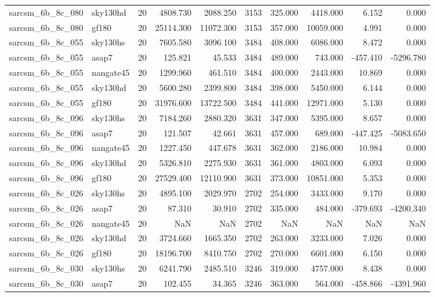 \documentclass{article}
\begin{document}
\begin{longtable}{llrrrrrrrr}
sarcsm\_6b\_8c\_080 & sky130hd & 20 & 4808.730 & 2088.250 & 3153 & 325.000 & 4418.000 & 6.152 & 0.000 \\
sarcsm\_6b\_8c\_080 & gf180 & 20 & 25114.300 & 11072.300 & 3153 & 357.000 & 10059.000 & 4.991 & 0.000 \\
sarcsm\_6b\_8c\_055 & sky130hs & 20 & 7605.580 & 3096.100 & 3484 & 408.000 & 6086.000 & 8.472 & 0.000 \\
sarcsm\_6b\_8c\_055 & asap7 & 20 & 125.821 & 45.533 & 3484 & 489.000 & 743.000 & -457.410 & -5296.780 \\
sarcsm\_6b\_8c\_055 & nangate45 & 20 & 1299.960 & 461.510 & 3484 & 400.000 & 2443.000 & 10.869 & 0.000 \\
sarcsm\_6b\_8c\_055 & sky130hd & 20 & 5600.280 & 2399.800 & 3484 & 398.000 & 5450.000 & 6.144 & 0.000 \\
sarcsm\_6b\_8c\_055 & gf180 & 20 & 31976.600 & 13722.500 & 3484 & 441.000 & 12971.000 & 5.130 & 0.000 \\
sarcsm\_6b\_8c\_096 & sky130hs & 20 & 7184.260 & 2880.320 & 3631 & 347.000 & 5395.000 & 8.657 & 0.000 \\
sarcsm\_6b\_8c\_096 & asap7 & 20 & 121.507 & 42.661 & 3631 & 457.000 & 689.000 & -447.425 & -5083.650 \\
sarcsm\_6b\_8c\_096 & nangate45 & 20 & 1227.450 & 447.678 & 3631 & 362.000 & 2186.000 & 10.984 & 0.000 \\
sarcsm\_6b\_8c\_096 & sky130hd & 20 & 5326.810 & 2275.930 & 3631 & 361.000 & 4803.000 & 6.093 & 0.000 \\
sarcsm\_6b\_8c\_096 & gf180 & 20 & 27529.400 & 12110.900 & 3631 & 373.000 & 10851.000 & 5.353 & 0.000 \\
sarcsm\_6b\_8c\_026 & sky130hs & 20 & 4895.100 & 2029.970 & 2702 & 254.000 & 3433.000 & 9.170 & 0.000 \\
sarcsm\_6b\_8c\_026 & asap7 & 20 & 87.310 & 30.910 & 2702 & 335.000 & 484.000 & -379.693 & -4200.340 \\
sarcsm\_6b\_8c\_026 & nangate45 & 20 & NaN & NaN & 2702 & NaN & NaN & NaN & NaN \\
sarcsm\_6b\_8c\_026 & sky130hd & 20 & 3724.660 & 1665.350 & 2702 & 263.000 & 3233.000 & 7.026 & 0.000 \\
sarcsm\_6b\_8c\_026 & gf180 & 20 & 18196.700 & 8410.750 & 2702 & 270.000 & 6601.000 & 6.150 & 0.000 \\
sarcsm\_6b\_8c\_030 & sky130hs & 20 & 6241.790 & 2485.510 & 3246 & 319.000 & 4757.000 & 8.438 & 0.000 \\
sarcsm\_6b\_8c\_030 & asap7 & 20 & 102.455 & 34.365 & 3246 & 363.000 & 564.000 & -458.866 & -4391.960 \\

\end{longtable}
\end{document}
